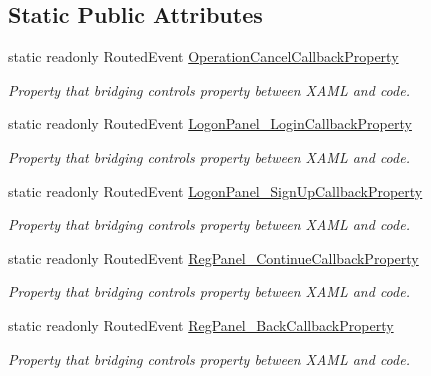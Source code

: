 \subsection*{Static Public Attributes}
\begin{DoxyCompactItemize}
\item 
static readonly Routed\+Event \mbox{\hyperlink{class_wpf_handler_1_1_u_i_1_1_controls_1_1_logon_1_1_logon_screen_a2d6e87038fcb0e1594e5ee244853d347}{Operation\+Cancel\+Callback\+Property}}
\begin{DoxyCompactList}\small\item\em Property that bridging control\textquotesingle{}s property between X\+A\+ML and code. \end{DoxyCompactList}\item 
static readonly Routed\+Event \mbox{\hyperlink{class_wpf_handler_1_1_u_i_1_1_controls_1_1_logon_1_1_logon_screen_a7ef6a8f429ce0b45e9bf91c350c9a87a}{Logon\+Panel\+\_\+\+Login\+Callback\+Property}}
\begin{DoxyCompactList}\small\item\em Property that bridging control\textquotesingle{}s property between X\+A\+ML and code. \end{DoxyCompactList}\item 
static readonly Routed\+Event \mbox{\hyperlink{class_wpf_handler_1_1_u_i_1_1_controls_1_1_logon_1_1_logon_screen_ad090d45d15c768ddad5ddf42be1b7c4a}{Logon\+Panel\+\_\+\+Sign\+Up\+Callback\+Property}}
\begin{DoxyCompactList}\small\item\em Property that bridging control\textquotesingle{}s property between X\+A\+ML and code. \end{DoxyCompactList}\item 
static readonly Routed\+Event \mbox{\hyperlink{class_wpf_handler_1_1_u_i_1_1_controls_1_1_logon_1_1_logon_screen_ae158e17e86546c10faa2e157b301c314}{Reg\+Panel\+\_\+\+Continue\+Callback\+Property}}
\begin{DoxyCompactList}\small\item\em Property that bridging control\textquotesingle{}s property between X\+A\+ML and code. \end{DoxyCompactList}\item 
static readonly Routed\+Event \mbox{\hyperlink{class_wpf_handler_1_1_u_i_1_1_controls_1_1_logon_1_1_logon_screen_aa813ce580f5ea686df06b3b050c292d1}{Reg\+Panel\+\_\+\+Back\+Callback\+Property}}
\begin{DoxyCompactList}\small\item\em Property that bridging control\textquotesingle{}s property between X\+A\+ML and code. \end{DoxyCompactList}\end{DoxyCompactItemize}
